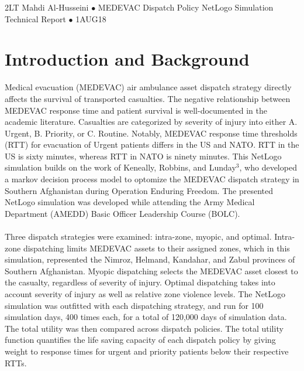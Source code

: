 \documentclass[10pt]{article}
\begin{document}
\begin{center}
  2LT Mahdi Al-Husseini $\bullet$ MEDEVAC Dispatch Policy NetLogo Simulation Technical Report $\bullet$ 1AUG18
\end{center}

\section{Introduction and Background}
Medical evacuation (MEDEVAC) air ambulance asset dispatch strategy directly affects the survival of transported casualties. The negative relationship between MEDEVAC response time and patient survival is well-documented in the academic literature. Casualties are categorized by severity of injury into either A. Urgent, B. Priority, or C. Routine. Notably, MEDEVAC response time thresholds (RTT) for evacuation of Urgent patients differs in the US and NATO. RTT in the US is sixty minutes, whereas RTT in NATO is ninety minutes. This NetLogo simulation builds on the work of Keneally, Robbins, and Lunday$^3$, who developed a markov decision process model to optomize the MEDEVAC dispatch strategy in Southern Afghanistan during Operation Enduring Freedom. The presented NetLogo simulation was developed while attending the Army Medical Department (AMEDD) Basic Officer Leadership Course (BOLC).
\\~\\
Three dispatch strategies were examined: intra-zone, myopic, and optimal. Intra-zone dispatching limits MEDEVAC assets to their assigned zones, which in this simulation, represented the Nimroz, Helmand, Kandahar, and Zabul provinces of Southern Afghanistan. Myopic dispatching selects the MEDEVAC asset closest to the casualty, regardless of severity of injury. Optimal dispatching takes into account severity of injury as well as relative zone violence levels. The NetLogo simulation was outfitted with each dispatching strategy, and run for 100 simulation days, 400 times each, for a total of 120,000 days of simulation data. The total utility was then compared across dispatch policies. The total utility function quantifies the life saving capacity of each dispatch policy by giving weight to response times for urgent and priority patients below their respective RTTs.
\end{document}
